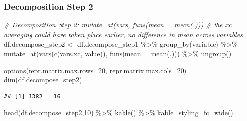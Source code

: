 \documentclass[
]{book}
\newenvironment{Shaded}{\begin{snugshade}}{\end{snugshade}}
\newcommand{\AttributeTok}[1]{\textcolor[rgb]{0.77,0.63,0.00}{#1}}
\newcommand{\CommentTok}[1]{\textcolor[rgb]{0.56,0.35,0.01}{\textit{#1}}}
\newcommand{\DecValTok}[1]{\textcolor[rgb]{0.00,0.00,0.81}{#1}}
\newcommand{\FunctionTok}[1]{\textcolor[rgb]{0.00,0.00,0.00}{#1}}
\newcommand{\NormalTok}[1]{#1}
\newcommand{\OtherTok}[1]{\textcolor[rgb]{0.56,0.35,0.01}{#1}}
\newcommand{\SpecialCharTok}[1]{\textcolor[rgb]{0.00,0.00,0.00}{#1}}
\newcommand{\StringTok}[1]{\textcolor[rgb]{0.31,0.60,0.02}{#1}}
\begin{document}
\hypertarget{decomposition-step-2}{%
\subsubsection{Decomposition Step 2}\label{decomposition-step-2}}

\begin{Shaded}
\begin{Highlighting}[]
\CommentTok{\# Decomposition Step 2: mutate\_at(vars, funs(mean = mean(.)))}
\CommentTok{\# the xc averaging could have taken place earlier, no difference in mean across variables}
\NormalTok{df.decompose\_step2 }\OtherTok{\textless{}{-}}\NormalTok{ df.decompose\_step1 }\SpecialCharTok{\%\textgreater{}\%}
                        \FunctionTok{group\_by}\NormalTok{(variable) }\SpecialCharTok{\%\textgreater{}\%}
                        \FunctionTok{mutate\_at}\NormalTok{(}\FunctionTok{vars}\NormalTok{(}\FunctionTok{c}\NormalTok{(vars.xc, }\StringTok{\textquotesingle{}value\textquotesingle{}}\NormalTok{)), }\FunctionTok{funs}\NormalTok{(}\AttributeTok{mean =} \FunctionTok{mean}\NormalTok{(.))) }\SpecialCharTok{\%\textgreater{}\%}
                        \FunctionTok{ungroup}\NormalTok{()}

\FunctionTok{options}\NormalTok{(}\AttributeTok{repr.matrix.max.rows=}\DecValTok{20}\NormalTok{, }\AttributeTok{repr.matrix.max.cols=}\DecValTok{20}\NormalTok{)}
\FunctionTok{dim}\NormalTok{(df.decompose\_step2)}
\end{Highlighting}
\end{Shaded}

\begin{verbatim}
## [1] 1382   16
\end{verbatim}

\begin{Shaded}
\begin{Highlighting}[]
\FunctionTok{head}\NormalTok{(df.decompose\_step2,}\DecValTok{10}\NormalTok{) }\SpecialCharTok{\%\textgreater{}\%}
  \FunctionTok{kable}\NormalTok{() }\SpecialCharTok{\%\textgreater{}\%}
  \FunctionTok{kable\_styling\_fc\_wide}\NormalTok{()}
\end{Highlighting}
\end{Shaded}
\end{document}
